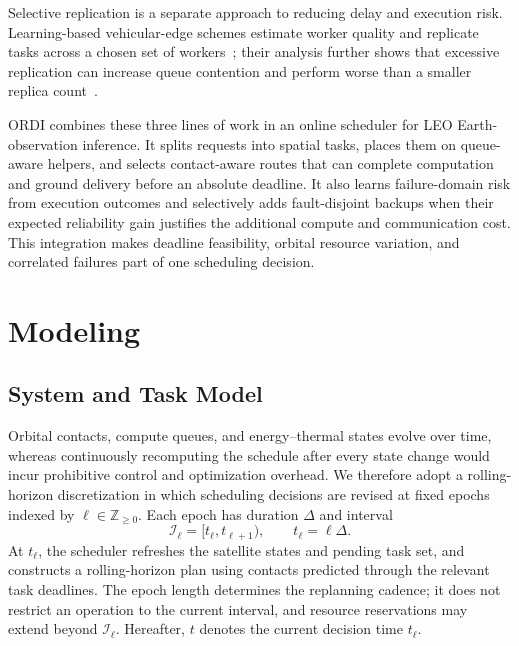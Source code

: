 \documentclass[conference]{IEEEtran}
\newcommand{\ordi}{ORDI}
\begin{document}
Selective replication is a separate approach to reducing delay and execution
risk. Learning-based vehicular-edge schemes estimate worker quality and
replicate tasks across a chosen set of workers~\cite{sun2018replication}; their
analysis further shows that excessive replication can increase queue contention
and perform worse than a smaller replica count~\cite{sun2021replication}.

\ordi{} combines these three lines of work in an online scheduler for LEO
Earth-observation inference. It splits requests into spatial tasks, places them
on queue-aware helpers, and selects contact-aware routes that can complete
computation and ground delivery before an absolute deadline. It also learns
failure-domain risk from execution outcomes and selectively adds fault-disjoint
backups when their expected reliability gain justifies the additional compute
and communication cost. This integration makes deadline feasibility, orbital
resource variation, and correlated failures part of one scheduling decision.

\section{Modeling}
\label{sec:modeling}

\subsection{System and Task Model}
\label{sec:model}

Orbital contacts, compute queues, and energy--thermal states evolve over time,
whereas continuously recomputing the schedule after every state change would
incur prohibitive control and optimization overhead. We therefore adopt a
rolling-horizon discretization in which scheduling decisions are revised at
fixed epochs indexed by $\ell\in\mathbb{Z}_{\ge 0}$. Each epoch has duration
$\Delta$ and interval
\begin{equation}
 \mathcal{I}_{\ell}=[t_{\ell},t_{\ell+1}),
 \qquad t_{\ell}=\ell\Delta .
 \label{eq:epoch}
\end{equation}
At $t_{\ell}$, the scheduler refreshes the satellite states and pending task
set, and constructs a rolling-horizon plan using contacts predicted through
the relevant task deadlines. The epoch length determines the replanning
cadence; it does not restrict an operation to the current interval, and
resource reservations may extend beyond $\mathcal{I}_{\ell}$. Hereafter, $t$
denotes the current decision time $t_{\ell}$.
\end{document}
